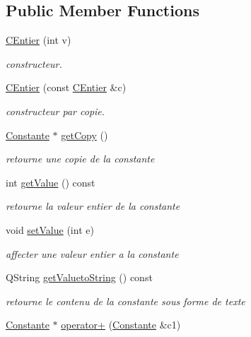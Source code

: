 \subsection*{Public Member Functions}
\begin{DoxyCompactItemize}
\item 
\hyperlink{class_c_entier_a27467aa3a76b88f836961b7a2536f0f4}{C\-Entier} (int v)
\begin{DoxyCompactList}\small\item\em constructeur. \end{DoxyCompactList}\item 
\hyperlink{class_c_entier_a8374a7a7dc66a7ea59be1fc6cd735376}{C\-Entier} (const \hyperlink{class_c_entier}{C\-Entier} \&c)
\begin{DoxyCompactList}\small\item\em constructeur par copie. \end{DoxyCompactList}\item 
\hyperlink{class_constante}{Constante} $\ast$ \hyperlink{class_c_entier_a48a8a57548157ff88606891b585aa04a}{get\-Copy} ()
\begin{DoxyCompactList}\small\item\em retourne une copie de la constante \end{DoxyCompactList}\item 
int \hyperlink{class_c_entier_a2fcca73095125600ac223a520f5b0ca0}{get\-Value} () const 
\begin{DoxyCompactList}\small\item\em retourne la valeur entier de la constante \end{DoxyCompactList}\item 
void \hyperlink{class_c_entier_a713823920b44ce30efd6c37320c87b93}{set\-Value} (int e)
\begin{DoxyCompactList}\small\item\em affecter une valeur entier a la constante \end{DoxyCompactList}\item 
Q\-String \hyperlink{class_c_entier_ae25f1f0b9422e1d7f256d8e15249e5b6}{get\-Valueto\-String} () const 
\begin{DoxyCompactList}\small\item\em retourne le contenu de la constante sous forme de texte \end{DoxyCompactList}\item 
\hyperlink{class_constante}{Constante} $\ast$ \hyperlink{class_c_entier_a90d87411cff696ada012b426082f9c87}{operator+} (\hyperlink{class_constante}{Constante} \&c1)

\end{DoxyCompactItemize}
